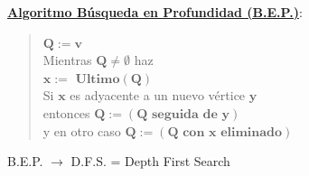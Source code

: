 \documentclass[twoside]{report}
\newcommand{\bs}[1]{\boldsymbol{#1}}
\begin{document}
\newpage
\noindent\underline{\textbf{Algoritmo Búsqueda en Profundidad (B.E.P.)}}:

        \begin{quotation}
        \noindent $\bs{Q:=v}$\\[1ex]
        \textsf{Mientras} $\bs{Q\neq\emptyset}$ \textsf{haz}\\[1ex]
        \hspace*{5ex} $\bs{x:=\mbox{ Ultimo}(Q)}$\\[1ex]
        \hspace*{5ex} \textsf{Si} $\bs{x}$ es adyacente a un nuevo vértice $\bs{y}$\\[1ex]
        \hspace*{10ex} \textsf{entonces} $\bs{Q:=(Q\mbox{ seguida de }y)}$\\[1ex]
        \hspace*{10ex} \textsf{y en otro caso} $\bs{Q:=(Q\mbox{ con }x\mbox{ eliminado})}$
        \end{quotation}

\vspace{0.4cm}
        B.E.P. $\rightarrow$ D.F.S. = Depth First Search
%
\end{document}
